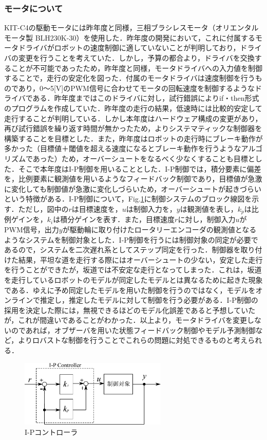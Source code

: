 \documentclass[10pt,a4paper]{jarticle}
\begin{document}
\subsubsection{モータについて}
KIT-C4の駆動モータには昨年度と同様，三相ブラシレスモータ（オリエンタルモータ製 BLH230K-30）を使用した．昨年度の開発において，これに付属するモータドライバがロボットの速度制御に適していないことが判明しており，ドライバの変更を行うことを考えていた．しかし，予算の都合より，ドライバを交換することが不可能であったため，昨年度と同様，モータドライバへの入力値を制御することで，走行の安定化を図った．付属のモータドライバは速度制御を行うものであり，0〜5[V]のPWM信号に合わせてモータの回転速度を制御するようなドライバである．昨年度まではこのドライバに対し，試行錯誤によりif・then形式のプログラムを作成していた．昨年度の走行の結果，低速時には比較的安定して走行することが判明している．しかし本年度はハードウェア構成の変更があり，再び試行錯誤を繰り返す時間が無かったため，よりシステマティックな制御器を構築することを目標とした．また，昨年度はロボットの走行時にブレーキ動作が多かった（目標値＋閾値を超える速度になるとブレーキ動作を行うようなアルゴリズムであった）ため，オーバーシュートをなるべく少なくすることも目標とした．そこで本年度はI-P制御を用いることとした．I-P制御では，積分要素に偏差を，比例要素に観測値を用いるようなフィードバック制御であり，目標値が急激に変化しても制御値が急激に変化しづらいため，オーバーシュートが起きづらいという特徴がある．I-P制御について，Fig.\ref{KIT_C4_i-pcontrol}に制御システムのブロック線図を示す．ただし，図中の$r$は目標速度を，$u$は制御入力を，$y$は観測値を表し，$k_p$は比例ゲインを，$k_i$は積分ゲインを表す．また，目標速度$r$に対し，制御入力$u$がPWM信号，出力$y$が駆動輪に取り付けたロータリーエンコーダの観測値となるようなシステムを制御対象とした．I-P制御を行うには制御対象の同定が必要であるので，システムを二次遅れ系としてステップ同定を行った．制御器を取り付けた結果，平坦な道を走行する際にはオーバーシュートの少ない，安定した走行を行うことができたが，坂道では不安定な走行となってしまった．これは，坂道を走行しているロボットのモデルが同定したモデルとは異なるために起きた現象である．ゆえに予め同定したモデルを用いた制御を行うのではなく，モデルをオンラインで推定し，推定したモデルに対して制御を行う必要がある．I-P制御の採用を決定した際には，無視できるほどのモデル化誤差であると予想していたが，これが間違いであることがわかった．以上より，モータドライバを変更しないのであれば，オブザーバを用いた状態フィードバック制御やモデル予測制御など，よりロバストな制御を行うことでこれらの問題に対処できるものと考えられる．

\begin{figure}[tbp]
  \centering
  \includegraphics[width=7cm]{fig/eps/KIT_C4_i-pcontrol.eps}
  \caption{I-Pコントローラ}
  \label{KIT_C4_i-pcontrol}
\end{figure}
\end{document}
